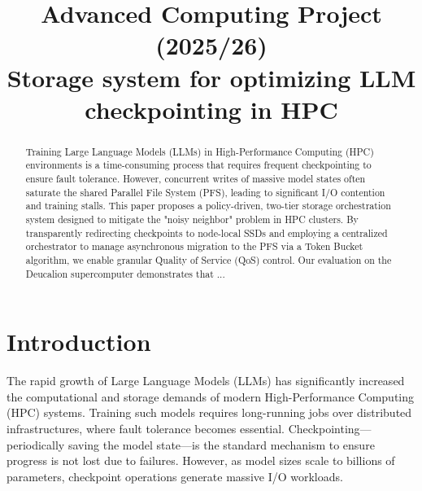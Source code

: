 \documentclass[conference,a4paper]{IEEEtran}
\begin{document}
\title{Advanced Computing Project (2025/26)\\
       \Large Storage system for optimizing LLM checkpointing in HPC}

\author{
    \and
    \and
    \and
}

\maketitle

\begin{abstract}
Training Large Language Models (LLMs) in High-Performance Computing (HPC) environments is a time-consuming process that requires frequent 
checkpointing to ensure fault tolerance. However, concurrent writes of massive model states often saturate the shared Parallel File System 
(PFS), leading to significant I/O contention and training stalls. This paper proposes a policy-driven, two-tier storage orchestration system
designed to mitigate the "noisy neighbor" problem in HPC clusters. By transparently redirecting checkpoints to node-local SSDs and employing
a centralized orchestrator to manage asynchronous migration to the PFS via a Token Bucket algorithm, we enable granular Quality of Service (QoS)
control. Our evaluation on the Deucalion supercomputer demonstrates that ... 
\end{abstract}

\begin{IEEEkeywords}
\end{IEEEkeywords}

\section{Introduction}

The rapid growth of Large Language Models (LLMs) has significantly increased the computational and storage demands of modern High-Performance Computing (HPC) systems. Training such models requires long-running jobs over distributed infrastructures, where fault tolerance becomes essential. Checkpointing—periodically saving the model state—is the standard mechanism to ensure progress is not lost due to failures. However, as model sizes scale to billions of parameters, checkpoint operations generate massive I/O workloads.
\end{document}
